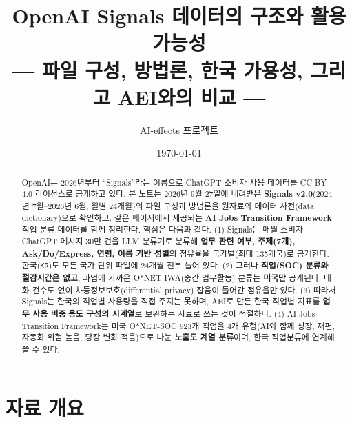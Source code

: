 \documentclass[11pt]{article}
\title{OpenAI Signals 데이터의 구조와 활용 가능성\\[2mm]
\large --- 파일 구성, 방법론, 한국 가용성, 그리고 AEI와의 비교 ---}
\author{AI-effects 프로젝트}
\date{\today}
\begin{document}
\maketitle

\begin{abstract}
\noindent OpenAI는 2026년부터 ``Signals''라는 이름으로 ChatGPT 소비자 사용 데이터를 CC BY 4.0 라이선스로 공개하고 있다. 본 노트는 2026년 9월 27일에 내려받은 \textbf{Signals v2.0}\parencite{openai-2026-signals-v2}(2024년 7월--2026년 6월, 월별 24개월)의 파일 구성과 방법론을 원자료와 데이터 사전(data dictionary)으로 확인하고, 같은 페이지에서 제공되는 \textbf{AI Jobs Transition Framework}\parencite{openai-2026-ai-jobs-transition-framework} 직업 분류 데이터를 함께 정리한다. 핵심은 다음과 같다. (1) Signals는 매월 소비자 ChatGPT 메시지 30만 건을 LLM 분류기로 분류해 \textbf{업무 관련 여부, 주제(7개), Ask/Do/Express, 연령, 이름 기반 성별}의 점유율을 국가별(최대 135개국)로 공개한다. 한국(\texttt{KR})도 모든 국가 단위 파일에 24개월 전부 들어 있다. (2) 그러나 \textbf{직업(SOC) 분류와 절감시간은 없고}, 과업에 가까운 O*NET IWA(중간 업무활동) 분류는 \textbf{미국만} 공개된다. 대화 건수도 없이 차등정보보호(differential privacy) 잡음이 들어간 점유율만 있다. (3) 따라서 Signals는 한국의 직업별 사용량을 직접 주지는 못하며, AEI로 만든 한국 직업별 지표를 \textbf{업무 사용 비중$\cdot$용도 구성의 시계열}로 보완하는 자료로 쓰는 것이 적절하다. (4) AI Jobs Transition Framework는 미국 O*NET-SOC 923개 직업을 4개 유형(AI와 함께 성장, 재편, 자동화 위험 높음, 당장 변화 적음)으로 나눈 \textbf{노출도 계열 분류}이며, 한국 직업분류에 연계해 쓸 수 있다.
\end{abstract}

\tableofcontents

\section{자료 개요}
\end{document}
